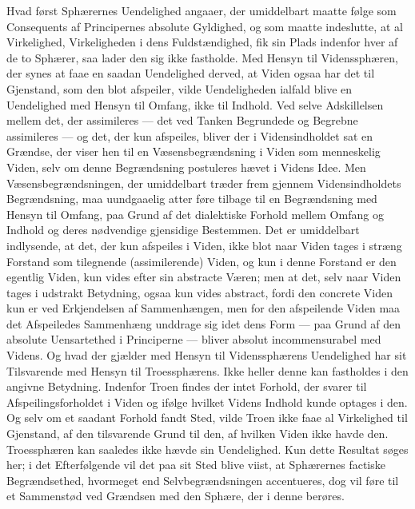 \documentclass[12pt,a4paper]{book}
\newcommand{\opage}[1]{\marginnote{\footnotesize\textit{[#1]}}}
\begin{document}
Hvad først Sphærernes Uendelighed angaaer, der umid\opage{28}delbart maatte følge som
Consequents af Principernes absolute Gyldighed, og som maatte indeslutte, at al
Virkelighed, Virkeligheden i dens Fuldstændighed, fik sin Plads indenfor hver af
de to Sphærer, saa lader den sig ikke fastholde. Med Hensyn til Videnssphæren,
der synes at faae en saadan Uendelighed derved, at Viden ogsaa har det til
Gjenstand, som den blot afspeiler, vilde Uendeligheden ialfald blive en
Uendelighed med Hensyn til Omfang, ikke til Indhold. Ved selve Adskillelsen
mellem det, der assimileres --- det ved Tanken Begrundede og Begrebne
assimileres --- og det, der kun afspeiles, bliver der i Vidensindholdet sat en
Grændse, der viser hen til en Væsensbegrændsning i Viden som menneskelig Viden,
selv om denne Begrændsning postuleres hævet i Videns Idee. Men
Væsensbegrændsningen, der umiddelbart træder frem gjennem Vidensindholdets
Begrændsning, maa uundgaaelig atter føre tilbage til en Begrændsning med Hensyn
til Omfang, paa Grund af det dialektiske Forhold mellem Omfang og Indhold og
deres nødvendige gjensidige Bestemmen. Det er umiddelbart indlysende, at det,
der kun afspeiles i Viden, ikke blot naar Viden tages i stræng Forstand som
tilegnende (assimilerende) Viden, og kun i denne Forstand er den egentlig Viden,
kun vides efter sin abstracte Væren; men at det, selv naar Viden tages i udstrakt
Betydning, ogsaa kun vides abstract, fordi den concrete Viden kun er ved
Erkjendelsen af Sammenhængen, men for den afspeilende Viden maa det Afspeiledes
Sammenhæng unddrage sig idet dens Form --- paa Grund af den absolute
Uensartethed i Principerne --- bliver absolut incommensurabel med Videns. Og
hvad der gjælder med Hensyn til Videnssphærens Uendelighed har sit Tilsvarende
med Hensyn til Troessphærens. Ikke heller denne kan fastholdes i den angivne
Betydning. Indenfor Troen findes der intet Forhold, der svarer til
Afspeilingsforholdet i Viden og ifølge hvilket Videns Indhold kunde optages i
den. Og selv om et saadant Forhold fandt Sted, vilde Troen ikke faae al
Virkelighed til Gjenstand, af den tilsvarende Grund til den, af hvilken Viden
ikke havde den. \opage{29}Troessphæren kan saaledes ikke hævde sin Uendelighed. Kun dette
Resultat søges her; i det Efterfølgende vil det paa sit Sted blive viist, at
Sphærernes factiske Begrændsethed, hvormeget end Selvbegrændsningen accentueres,
dog vil føre til et Sammenstød ved Grændsen med den Sphære, der i denne berøres.
\end{document}
